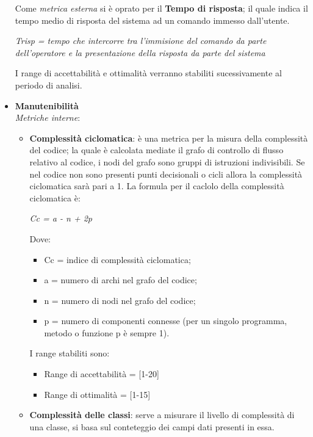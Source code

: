 \begin{itemize}
      Come \emph{metrica esterna} si è oprato per il \textbf{Tempo di risposta};
      il quale indica il tempo medio di risposta del sistema ad un comando immesso dall'utente.
      \begin{center}
        \emph{Trisp = tempo che intercorre tra l'immisione del comando da parte dell'operatore e la presentazione della risposta da parte del sistema}
      \end{center}
      I range di accettabilità e ottimalità verranno stabiliti sucessivamente al periodo di analisi.
      \item \textbf{Manutenibilità}\\
        \emph{Metriche interne}:
        \begin{itemize}
          \item \textbf{Complessità ciclomatica}: è una metrica per la misura della complessità del codice; la quale è calcolata mediate il grafo di controllo di flusso relativo al codice,
            i nodi del grafo sono gruppi di istruzioni indivisibili. Se nel codice non sono presenti punti decisionali o cicli allora la complessità ciclomatica sarà pari a 1. La formula per il caclolo della complessità ciclomatica è:
            \begin{center}
              \emph{Cc = a - n + 2p}
            \end{center}
            Dove:
            \begin{itemize}
              \item Cc = indice di complessità ciclomatica;
              \item a = numero di archi nel grafo del codice;
              \item n = numero di nodi nel grafo del codice;
              \item p = numero di componenti connesse (per un singolo programma, metodo o funzione p è sempre 1).
            \end{itemize}
            I range stabiliti sono:
            \begin{itemize}
              \item Range di accettabilità = [1-20]
              \item Range di ottimalità = [1-15]
            \end{itemize}
          \item \textbf{Complessità delle classi}: serve a misurare il livello di complessità di una classe, si basa sul conteteggio dei campi dati presenti in essa.
            \begin{center}

\end{center}
\end{itemize}
\end{itemize}

